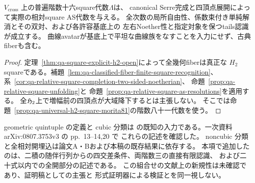 \begin{corollary}
\label{cor:qa-explicit-h2-atlas-square-as}
$V_{\mathrm{cross}}$ 上の普遍階数十六square代数$\Lambda$は、
canonical Serre完成と四頂点展開によって実際の相対square AS代数を与える。
全次数の局所自由性、係数束付き単純解消とその双対、および各許容基底上の
左右Noether性と指定対象を保つtails認識が成立する。
曲線avatarが基底上で平坦な曲線族をなすことを入力にせず、古典fiberも含む。
\end{corollary}
\begin{proof}
定理~\ref{thm:qa-square-explicit-h2-open}によって全幾何fiberは真正な
$H_2$ squareである。補題~\ref{lem:qa-classified-fiber-finite-square-recognition}、
系~\ref{cor:qa-relative-square-completion-two-sided-noetherian}、
命題~\ref{prop:qa-relative-square-unfolding}と
命題~\ref{prop:qa-relative-square-as-resolutions}を適用する。
全$\mathfrak H_2$上で増幅前の四頂点が大域降下するとは主張しない。
そこでは命題~\ref{prop:qa-universal-h2-square-morita81}の階数八十一代数を使う。
\end{proof}

\begin{remark}[入力と本項の位置付け]
geometric quintuple の定義と cubic 分類は
\cite[Definition 5.3.1, Lemma 5.3.3, Theorem 5.5.10]{VdB2011}
の既知の入力である。一次資料 arXiv:0807.3753v3 の pp.~13--14,20 で
これらの記述を確認した。
noncubic 分類と全相対開埋込は論文A・Bおよび本稿の既存結果に依存する。
本項で追加したのは、二積の随伴行列からの四交差条件、両階数三の直接有限認識、
および二十式以内での全開部分の記述である。
この組合せの文献上の新規性は未確認であり、証明稿としての主張と
形式証明器による検証とを同一視しない。
\end{remark}
